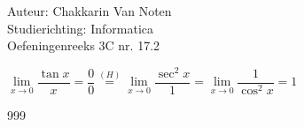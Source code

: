 \documentclass[a4paper]{article}
\begin{document}
  
\noindent \large Auteur: Chakkarin Van Noten \\
\noindent \large Studierichting: Informatica\\
\noindent \large Oefeningenreeks 3C nr. 17.2\\

\medskip

\normalsize

$\lim\limits_{x \to 0} \dfrac{\tan x}{x} = \dfrac{0}{0} \stackrel{(H)}{=} \lim\limits_{x \to 0} \dfrac{\sec^2 x}{1} = \lim\limits_{x \to 0} \dfrac{1}{\cos^2 x} = 1$

\begin{thebibliography}{999}
\end{thebibliography}
\end{document}
